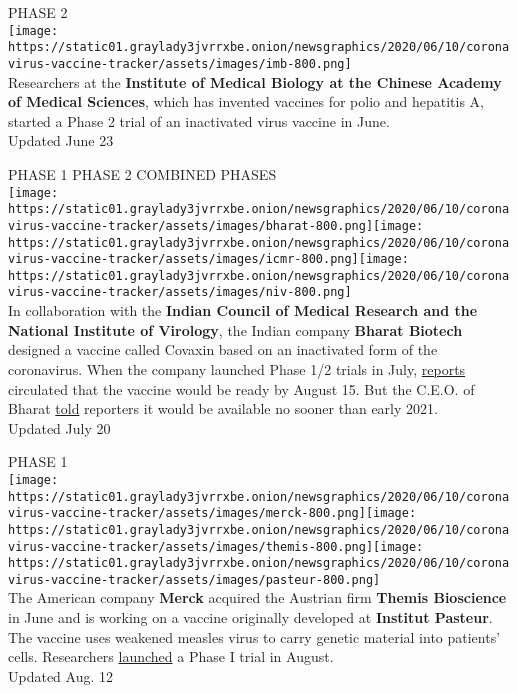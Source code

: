 PHASE 2\\
\texttt{[image: https://static01.graylady3jvrrxbe.onion/newsgraphics/2020/06/10/coronavirus-vaccine-tracker/assets/images/imb-800.png]}\\
Researchers at the \textbf{Institute of Medical Biology at the Chinese
Academy of Medical Sciences}, which has invented vaccines for polio and
hepatitis A, started a Phase 2 trial of an inactivated virus vaccine in
June.\\
Updated June 23

PHASE 1 PHASE 2 COMBINED PHASES\\
\texttt{[image: https://static01.graylady3jvrrxbe.onion/newsgraphics/2020/06/10/coronavirus-vaccine-tracker/assets/images/bharat-800.png]}\texttt{[image: https://static01.graylady3jvrrxbe.onion/newsgraphics/2020/06/10/coronavirus-vaccine-tracker/assets/images/icmr-800.png]}\texttt{[image: https://static01.graylady3jvrrxbe.onion/newsgraphics/2020/06/10/coronavirus-vaccine-tracker/assets/images/niv-800.png]}\\
In collaboration with the \textbf{Indian Council of Medical Research and
the National Institute of Virology}, the Indian company \textbf{Bharat
Biotech} designed a vaccine called Covaxin based on an inactivated form
of the coronavirus. When the company launched Phase 1/2 trials in July,
\href{https://uk.reuters.com/article/uk-health-coronavirus-india-bharat-biote/health-experts-cast-doubt-on-indias-timeline-for-covid-vaccine-idUKKBN2440XD}{reports}
circulated that the vaccine would be ready by August 15. But the C.E.O.
of Bharat
\href{https://www.newindianexpress.com/nation/2020/jul/03/interview--covaxin-by-2021-if-all-goes-well-bharat-biotech-chairman-2164708.html}{told}
reporters it would be available no sooner than early 2021.\\
Updated July 20

PHASE 1\\
\texttt{[image: https://static01.graylady3jvrrxbe.onion/newsgraphics/2020/06/10/coronavirus-vaccine-tracker/assets/images/merck-800.png]}\texttt{[image: https://static01.graylady3jvrrxbe.onion/newsgraphics/2020/06/10/coronavirus-vaccine-tracker/assets/images/themis-800.png]}\texttt{[image: https://static01.graylady3jvrrxbe.onion/newsgraphics/2020/06/10/coronavirus-vaccine-tracker/assets/images/pasteur-800.png]}\\
The American company \textbf{Merck} acquired the Austrian firm
\textbf{Themis Bioscience} in June and is working on a vaccine
originally developed at \textbf{Institut Pasteur}. The vaccine uses
weakened measles virus to carry genetic material into patients' cells.
Researchers
\href{https://clinicaltrials.gov/ct2/show/NCT04497298?term=vaccine\&cond=covid-19\&draw=2\&rank=1}{launched}
a Phase I trial in August.\\
Updated Aug. 12

